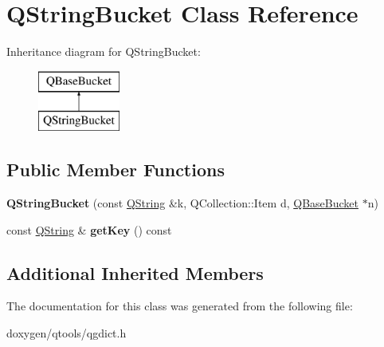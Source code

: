 \hypertarget{class_q_string_bucket}{}\section{Q\+String\+Bucket Class Reference}
\label{class_q_string_bucket}
Inheritance diagram for Q\+String\+Bucket\+:\begin{figure}[H]
\begin{center}
\leavevmode
\includegraphics[height=2.000000cm]{class_q_string_bucket}
\end{center}
\end{figure}
\subsection*{Public Member Functions}
\begin{DoxyCompactItemize}
\item 
\mbox{\label{class_q_string_bucket_ab73eda6e5bef856c855183f66fe6a764}} 
{\bfseries Q\+String\+Bucket} (const \mbox{\hyperlink{class_q_string}{Q\+String}} \&k, Q\+Collection\+::\+Item d, \mbox{\hyperlink{class_q_base_bucket}{Q\+Base\+Bucket}} $\ast$n)
\item 
\mbox{\label{class_q_string_bucket_a21988e05a276e2c2c5a6ac7157733fba}} 
const \mbox{\hyperlink{class_q_string}{Q\+String}} \& {\bfseries get\+Key} () const
\end{DoxyCompactItemize}
\subsection*{Additional Inherited Members}


The documentation for this class was generated from the following file\+:\begin{DoxyCompactItemize}
\item 
doxygen/qtools/qgdict.\+h\end{DoxyCompactItemize}
